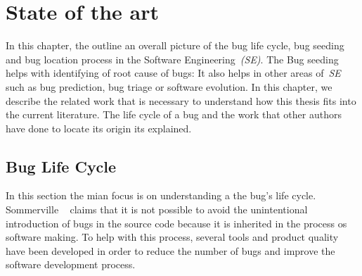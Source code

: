 \documentclass[a4paper, 12pt]{book}
\begin{document}

\cleardoublepage
\chapter{State of the art}
\label{chap:stateoftheart}
In this chapter, the outline an overall picture of the bug life cycle, bug seeding and bug location process in the Software Engineering~\emph{(SE)}. The Bug seeding helps with identifying of root cause of bugs: It also helps in other areas of~\emph{SE} such as bug prediction, bug triage or software evolution. In this chapter, we describe the related work that is necessary to understand how this thesis fits into the current literature. The life cycle of a bug and the work that other authors have done to locate its origin its explained.

\section{Bug Life Cycle}
\label{subsec:buglife}
In this section the mian focus is on understanding a the bug's life cycle. Sommerville ~\cite{sommerville2010software} claims that it is not possible to avoid the unintentional introduction of bugs in the source code because it is inherited in the process os software making. To help with this process, several tools and product quality have been developed in order to reduce the number of bugs and improve the software development process.
\end{document}
